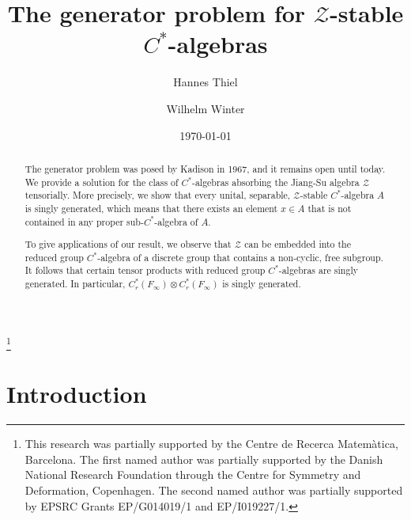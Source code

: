 \documentclass{amsart}
\theoremstyle{definition}
\begin{document}
\title[The generator problem for $\mathcal{Z}$-stable $C^{*}$-algebras]{The generator problem for $\mathcal{Z}$-stable $C^*$-algebras}
\author{Hannes Thiel}
\address{Department of Mathematical Sciences, University of Copenhagen, Universitetsparken 5, DK-2100, Copenhagen \O, Denmark}

\author{Wilhelm Winter}
\address{Mathematisches Institut der Universit\"at M\"unster, Einsteinstr. 62, 48149 M\"unster, Germany}

\thanks{
This research was partially supported by the Centre de Recerca Matem\`{a}tica, Barcelona.
The first named author was partially supported by the Danish National Research Foundation through the Centre for Symmetry and Deformation, Copenhagen.
The second named author was partially supported by EPSRC Grants  EP/G014019/1  and EP/I019227/1.
}



\date{\today}

\begin{abstract}
    The generator problem was posed by Kadison in 1967, and it remains open until today.
    We provide a solution for the class of {{$C^*$-al\-ge\-bra}}{s} absorbing the Jiang-Su algebra $\mathcal{Z}$ tensorially.
    More precisely, we show that every unital, separable, $\mathcal{Z}$-stable {{$C^*$-al\-ge\-bra}}{} $A$ is singly generated, which means that there exists an element $x\in A$ that is not contained in any proper sub-{{$C^*$-al\-ge\-bra}}{} of $A$.

    To give applications of our result, we observe that $\mathcal{Z}$ can be embedded into the reduced group {{$C^*$-al\-ge\-bra}}{} of a discrete group that contains a non-cyclic, free subgroup.
    It follows that certain tensor products with reduced group {{$C^*$-al\-ge\-bra}}{s} are singly generated.
    In particular, $C^*_r(F_\infty)\otimes C^*_r(F_\infty)$ is singly generated.
\end{abstract}

\maketitle

\section{Introduction}
\end{document}
